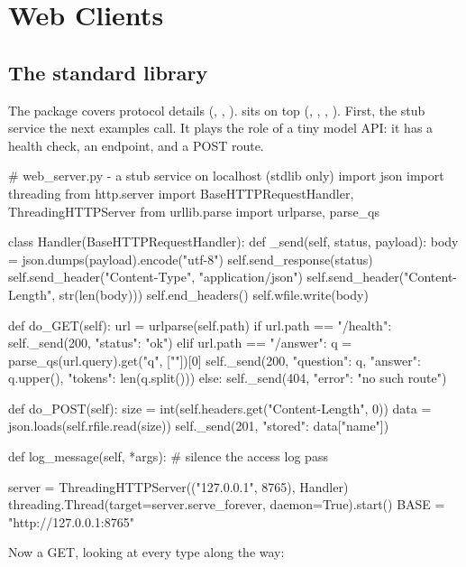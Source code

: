\section{Web Clients}

\subsection{The standard library}

The  package covers protocol details (, , ).
 sits on top (, , , ). First,
the stub service the next examples call. It plays the role of a tiny model API: it has a health
check, an  endpoint, and a POST route.

\begin{pycode}
# web_server.py - a stub service on localhost (stdlib only)
import json
import threading
from http.server import BaseHTTPRequestHandler, ThreadingHTTPServer
from urllib.parse import urlparse, parse_qs


class Handler(BaseHTTPRequestHandler):
    def _send(self, status, payload):
        body = json.dumps(payload).encode("utf-8")
        self.send_response(status)
        self.send_header("Content-Type", "application/json")
        self.send_header("Content-Length", str(len(body)))
        self.end_headers()
        self.wfile.write(body)

    def do_GET(self):
        url = urlparse(self.path)
        if url.path == "/health":
            self._send(200, {"status": "ok"})
        elif url.path == "/answer":
            q = parse_qs(url.query).get("q", [""])[0]
            self._send(200, {"question": q, "answer": q.upper(),
                             "tokens": len(q.split())})
        else:
            self._send(404, {"error": "no such route"})

    def do_POST(self):
        size = int(self.headers.get("Content-Length", 0))
        data = json.loads(self.rfile.read(size))
        self._send(201, {"stored": data["name"]})

    def log_message(self, *args):    # silence the access log
        pass


server = ThreadingHTTPServer(("127.0.0.1", 8765), Handler)
threading.Thread(target=server.serve_forever, daemon=True).start()
BASE = "http://127.0.0.1:8765"
\end{pycode}

Now a GET, looking at every type along the way:

